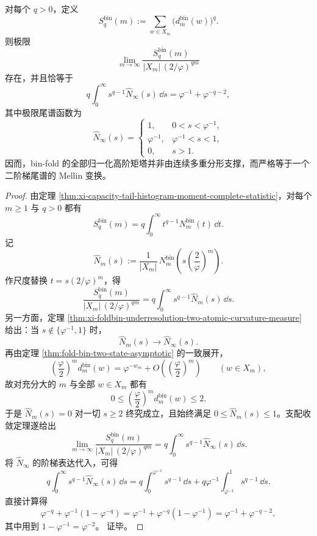 \begin{theorem}\label{thm:conclusion-binfold-mellin-two-step-law}
对每个 \(q>0\)，定义
\[
S_q^{\mathrm{bin}}(m):=\sum_{w\in X_m}\bigl(d_m^{\mathrm{bin}}(w)\bigr)^q.
\]
则极限
\[
\lim_{m\to\infty}
\frac{S_q^{\mathrm{bin}}(m)}{|X_m|\,(2/\varphi)^{qm}}
\]
存在，并且恰等于
\[
q\int_0^\infty s^{q-1}\widehat N_\infty(s)\,\dd s
=
\varphi^{-1}+\varphi^{-q-2},
\]
其中极限尾谱函数为
\[
\widehat N_\infty(s)=
\begin{cases}
1,& 0<s<\varphi^{-1},\\[2pt]
\varphi^{-1},& \varphi^{-1}<s<1,\\[2pt]
0,& s>1.
\end{cases}
\]
因而，bin-fold 的全部归一化高阶矩塔并非由连续多重分形支撑，而严格等于一个二阶梯尾谱的 Mellin 变换。
\end{theorem}
\begin{proof}
由定理 \ref{thm:xi-capacity-tail-histogram-moment-complete-statistic}，对每个 \(m\ge 1\) 与 \(q>0\) 都有
\[
S_q^{\mathrm{bin}}(m)
=
q\int_0^\infty t^{q-1}N_m^{\mathrm{bin}}(t)\,\dd t.
\]
记
\[
\widehat N_m(s):=
\frac{1}{|X_m|}\,
N_m^{\mathrm{bin}}\!\left(s\left(\frac{2}{\varphi}\right)^m\right).
\]
作尺度替换 \(t=s(2/\varphi)^m\)，得
\[
\frac{S_q^{\mathrm{bin}}(m)}{|X_m|\,(2/\varphi)^{qm}}
=
q\int_0^\infty s^{q-1}\widehat N_m(s)\,\dd s.
\]
另一方面，定理 \ref{thm:xi-foldbin-underresolution-two-atomic-curvature-measure} 给出：当
\(
s\notin\{\varphi^{-1},1\}
\)
时，
\[
\widehat N_m(s)\longrightarrow \widehat N_\infty(s).
\]
再由定理 \ref{thm:fold-bin-two-state-asymptotic} 的一致展开，
\[
\left(\frac{\varphi}{2}\right)^m d_m^{\mathrm{bin}}(w)
=
\varphi^{-w_m}+O\!\left(\left(\frac{\varphi}{2}\right)^m\right)
\qquad (w\in X_m),
\]
故对充分大的 \(m\) 与全部 \(w\in X_m\) 都有
\[
0\le \left(\frac{\varphi}{2}\right)^m d_m^{\mathrm{bin}}(w)\le 2.
\]
于是 \(\widehat N_m(s)=0\) 对一切 \(s\ge 2\) 终究成立，且始终满足 \(0\le \widehat N_m(s)\le 1\)。支配收敛定理遂给出
\[
\lim_{m\to\infty}
\frac{S_q^{\mathrm{bin}}(m)}{|X_m|\,(2/\varphi)^{qm}}
=
q\int_0^\infty s^{q-1}\widehat N_\infty(s)\,\dd s.
\]
将 \(\widehat N_\infty\) 的阶梯表达代入，可得
\[
q\int_0^\infty s^{q-1}\widehat N_\infty(s)\,\dd s
=
q\int_0^{\varphi^{-1}}s^{q-1}\,\dd s
+
q\varphi^{-1}\int_{\varphi^{-1}}^{1}s^{q-1}\,\dd s.
\]
直接计算得
\[
\varphi^{-q}+\varphi^{-1}(1-\varphi^{-q})
=
\varphi^{-1}+\varphi^{-q}(1-\varphi^{-1})
=
\varphi^{-1}+\varphi^{-q-2},
\]
其中用到
\(
1-\varphi^{-1}=\varphi^{-2}
\)。
证毕。
\end{proof}

